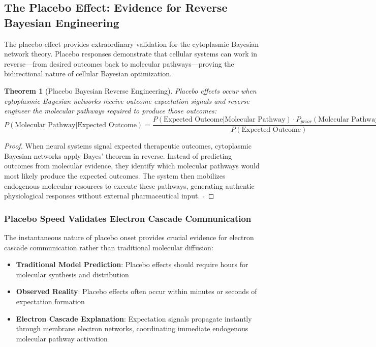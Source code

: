 \documentclass[12pt,a4paper]{article}
\newtheorem{theorem}{Theorem}
\begin{document}
\subsection{The Placebo Effect: Evidence for Reverse Bayesian Engineering}

The placebo effect provides extraordinary validation for the cytoplasmic Bayesian network theory. Placebo responses demonstrate that cellular systems can work in reverse—from desired outcomes back to molecular pathways—proving the bidirectional nature of cellular Bayesian optimization.

\begin{theorem}[Placebo Bayesian Reverse Engineering]
Placebo effects occur when cytoplasmic Bayesian networks receive outcome expectation signals and reverse engineer the molecular pathways required to produce those outcomes:
\begin{equation}
P(\text{Molecular Pathway}|\text{Expected Outcome}) = \frac{P(\text{Expected Outcome}|\text{Molecular Pathway}) \cdot P_{prior}(\text{Molecular Pathway})}{P(\text{Expected Outcome})}
\end{equation}
\end{theorem}

\begin{proof}
When neural systems signal expected therapeutic outcomes, cytoplasmic Bayesian networks apply Bayes' theorem in reverse. Instead of predicting outcomes from molecular evidence, they identify which molecular pathways would most likely produce the expected outcomes. The system then mobilizes endogenous molecular resources to execute these pathways, generating authentic physiological responses without external pharmaceutical input. $\square$
\end{proof}

\subsubsection{Placebo Speed Validates Electron Cascade Communication}

The instantaneous nature of placebo onset provides crucial evidence for electron cascade communication rather than traditional molecular diffusion:

\begin{itemize}
\item \textbf{Traditional Model Prediction}: Placebo effects should require hours for molecular synthesis and distribution
\item \textbf{Observed Reality}: Placebo effects often occur within minutes or seconds of expectation formation
\item \textbf{Electron Cascade Explanation}: Expectation signals propagate instantly through membrane electron networks, coordinating immediate endogenous molecular pathway activation
\end{itemize}
\end{document}
